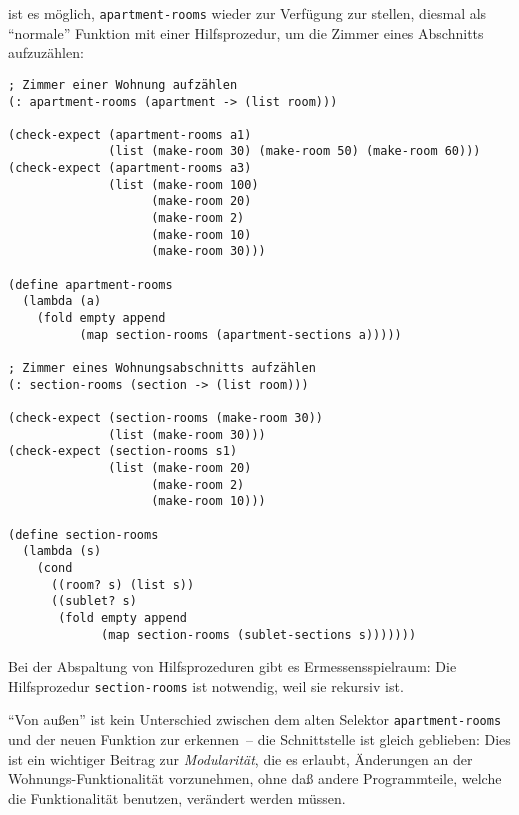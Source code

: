 ist es möglich, \texttt{apartment-rooms} wieder zur Verfügung zur
stellen, diesmal als "`normale"' Funktion mit einer Hilfsprozedur, um
die Zimmer eines Abschnitts aufzuzählen:
%
\begin{verbatim}
; Zimmer einer Wohnung aufzählen
(: apartment-rooms (apartment -> (list room)))

(check-expect (apartment-rooms a1)
              (list (make-room 30) (make-room 50) (make-room 60)))
(check-expect (apartment-rooms a3)
              (list (make-room 100)
                    (make-room 20)
                    (make-room 2)
                    (make-room 10)
                    (make-room 30)))

(define apartment-rooms
  (lambda (a)
    (fold empty append
          (map section-rooms (apartment-sections a)))))

; Zimmer eines Wohnungsabschnitts aufzählen
(: section-rooms (section -> (list room)))

(check-expect (section-rooms (make-room 30))
              (list (make-room 30)))
(check-expect (section-rooms s1)
              (list (make-room 20)
                    (make-room 2)
                    (make-room 10)))
              
(define section-rooms
  (lambda (s)
    (cond
      ((room? s) (list s))
      ((sublet? s)
       (fold empty append
             (map section-rooms (sublet-sections s)))))))
\end{verbatim}
%
Bei der Abspaltung von Hilfsprozeduren gibt es Ermessensspielraum:
Die Hilfsprozedur \texttt{section-rooms} ist notwendig, weil sie
rekursiv ist.

"`Von außen"' ist kein Unterschied zwischen dem alten Selektor
\texttt{apartment-rooms} und der neuen Funktion zur erkennen~-- die
Schnittstelle ist gleich geblieben: Dies ist ein wichtiger Beitrag zur
\textit{Modularität}, die es erlaubt, Änderungen an
der Wohnungs-Funktionalität vorzunehmen, ohne daß andere
Programmteile, welche die Funktionalität benutzen, verändert werden
müssen.

